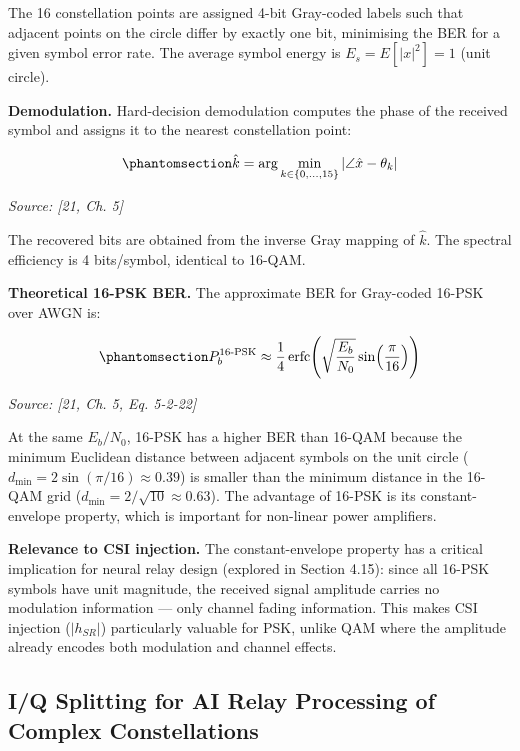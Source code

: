 The 16 constellation points are assigned 4-bit Gray-coded labels such that adjacent points on the circle differ by exactly one bit, minimising the BER for a given symbol error rate. The average symbol energy is \(E_s = E[|x|^2] = 1\) (unit circle).

\textbf{Demodulation.} Hard-decision demodulation computes the phase of the received symbol and assigns it to the nearest constellation point:

\begin{equation}\protect\phantomsection\label{eq:psk16-decision}{\hat{k} = \arg\min_{k \in \{0,\ldots,15\}} \left| \angle \hat{x} - \theta_k \right|
}\end{equation} \par{\small\textit{Source: [21, Ch. 5]}}

The recovered bits are obtained from the inverse Gray mapping of \(\hat{k}\). The spectral efficiency is 4 bits/symbol, identical to 16-QAM.

\textbf{Theoretical 16-PSK BER.} The approximate BER for Gray-coded 16-PSK over AWGN is:

\begin{equation}\protect\phantomsection\label{eq:psk16-ber}{P_b^{\text{16-PSK}} \approx \frac{1}{4} \operatorname{erfc}\!\left(\sqrt{\frac{E_b}{N_0}} \sin\!\left(\frac{\pi}{16}\right)\right)
}\end{equation} \par{\small\textit{Source: [21, Ch. 5, Eq. 5-2-22]}}

At the same \(E_b/N_0\), 16-PSK has a higher BER than 16-QAM because the minimum Euclidean distance between adjacent symbols on the unit circle (\(d_{\min} = 2\sin(\pi/16) \approx 0.39\)) is smaller than the minimum distance in the 16-QAM grid (\(d_{\min} = 2/\sqrt{10} \approx 0.63\)). The advantage of 16-PSK is its constant-envelope property, which is important for non-linear power amplifiers.

\textbf{Relevance to CSI injection.} The constant-envelope property has a critical implication for neural relay design (explored in Section 4.15): since all 16-PSK symbols have unit magnitude, the received signal amplitude carries no modulation information --- only channel fading information. This makes CSI injection (\(|h_{SR}|\)) particularly valuable for PSK, unlike QAM where the amplitude already encodes both modulation and channel effects.

\subsection{I/Q Splitting for AI Relay Processing of Complex Constellations}\label{sec:iq-splitting-for-ai-relay-processing-of-complex-constellations}

